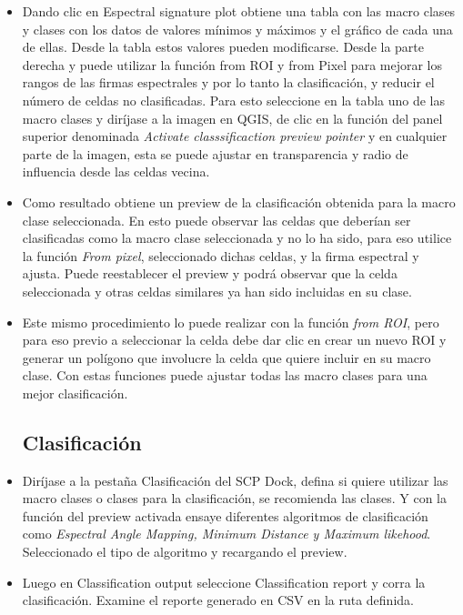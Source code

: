 \documentclass[a4paper,oneside,11pt,]{article}
\begin{document}
\begin{itemize}
\item Dando clic en Espectral signature plot obtiene una tabla con las macro clases y clases con los datos de valores mínimos y máximos y el gráfico de cada una de ellas. Desde la tabla estos valores pueden modificarse. Desde la parte derecha y puede utilizar la función from ROI y from Pixel para mejorar los rangos de las firmas espectrales y por lo tanto la clasificación, y reducir el número de celdas no clasificadas. Para esto seleccione en la tabla uno de las macro clases y diríjase a la imagen en QGIS, de clic en la función del panel superior denominada \emph{Activate classsificaction preview pointer} y en cualquier parte de la imagen, esta se puede ajustar en transparencia y radio de influencia desde las celdas vecina. 
\item Como resultado obtiene un preview de la clasificación obtenida para la macro clase seleccionada. En esto puede observar las celdas que deberían ser clasificadas como la macro clase seleccionada y no lo ha sido, para eso utilice la función \emph{From pixel}, seleccionado dichas celdas, y la firma espectral y ajusta. Puede reestablecer el preview y podrá observar que la celda seleccionada y otras celdas similares ya han sido incluidas en su clase. 
\item Este mismo procedimiento lo puede realizar con la función \emph{from ROI}, pero para eso previo a seleccionar la celda debe dar clic en crear un nuevo ROI y generar un polígono que involucre la celda que quiere incluir en su macro clase. Con estas funciones puede ajustar todas las macro clases para una mejor clasificación.

\subsection*{Clasificación}
\item Diríjase a la pestaña Clasificación del SCP Dock, defina si quiere utilizar las macro clases o clases para la clasificación, se recomienda las clases. Y con la función del preview activada ensaye diferentes algoritmos de clasificación como \emph{Espectral Angle Mapping, Minimum Distance y Maximum likehood}. Seleccionado el tipo de algoritmo y recargando el preview.
\item Luego en Classification output seleccione Classification report y corra la clasificación. Examine el reporte generado en CSV en la ruta definida.
\end{itemize}
\end{document}
